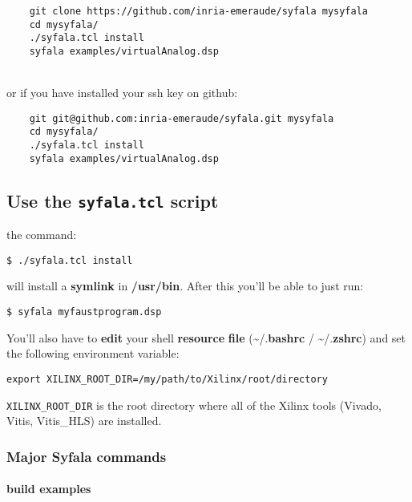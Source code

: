 \begin{boxedminipage}{\textwidth}
  \begin{verbatim}
    git clone https://github.com/inria-emeraude/syfala mysyfala
    cd mysyfala/
    ./syfala.tcl install
    syfala examples/virtualAnalog.dsp
\end{verbatim}
\end{boxedminipage}

~\\

or if you have installed your ssh key on github:\\

\begin{boxedminipage}{\textwidth}
  \begin{verbatim}
    git git@github.com:inria-emeraude/syfala.git mysyfala
    cd mysyfala/
    ./syfala.tcl install
    syfala examples/virtualAnalog.dsp
\end{verbatim}
\end{boxedminipage}


\subsection{Use the {\tt syfala.tcl} script}

the command:

\texttt{\$\ ./syfala.tcl\ install}

will install a
\textbf{symlink} in \textbf{/usr/bin}. After this you'll be able to just
run:

\texttt{\$\ syfala\ myfaustprogram.dsp}

You'll also have to \textbf{edit} your shell \textbf{resource}
\textbf{file} (\textasciitilde/.\textbf{bashrc} /
\textasciitilde/.\textbf{zshrc}) and set the following environment
variable:

\begin{verbatim}
export XILINX_ROOT_DIR=/my/path/to/Xilinx/root/directory
\end{verbatim}

\texttt{XILINX\_ROOT\_DIR} is the root directory where all of the Xilinx
tools (Vivado, Vitis, Vitis\_HLS) are installed.


\subsubsection{Major Syfala commands}\label{quick-start}

\hypertarget{build-examples}{%
\paragraph{build examples}\label{build-examples}}

